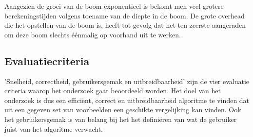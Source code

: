 \documentclass[Main.tex]{subfiles}
\begin{document}
Aangezien de groei van de boom exponentieel is bekomt men veel grotere berekeningstijden volgens toename van de diepte in de boom. De grote overhead die het opstellen van de boom is, heeft tot gevolg dat het ten zeerste aangeraden om deze boom slechts \'e\'enmalig op voorhand uit te werken.

\subsection{Evaluatiecriteria}

'Snelheid, correctheid, gebruikersgemak en uitbreidbaarheid' zijn de vier evaluatie criteria waarop het onderzoek gaat beoordeeld worden. Het doel van het onderzoek is dus een effici\"ent, correct en uitbreidbaarheid algoritme te vinden dat uit een gegeven set van voorbeelden een geschikte vergelijking kan vinden. Ook het gebruikersgemak is van belang bij het het defini\"eren van wat de gebruiker juist van het algoritme verwacht.
\end{document}
